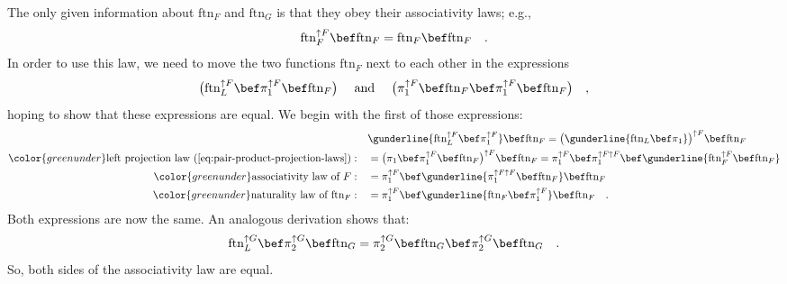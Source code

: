 The only given information about $\text{ftn}_{F}$ and $\text{ftn}_{G}$
is that they obey their associativity laws; e.g.,
\[
\text{ftn}_{F}^{\uparrow F}\bef\text{ftn}_{F}=\text{ftn}_{F}\bef\text{ftn}_{F}\quad.
\]
In order to use this law, we need to move the two functions $\text{ftn}_{F}$
next to each other in the expressions 
\[
\big(\text{ftn}_{L}^{\uparrow F}\bef\pi_{1}^{\uparrow F}\bef\text{ftn}_{F}\big)\quad\text{ and }\quad\big(\pi_{1}^{\uparrow F}\bef\text{ftn}_{F}\bef\pi_{1}^{\uparrow F}\bef\text{ftn}_{F}\big)\quad,
\]
hoping to show that these expressions are equal. We begin with the
first of those expressions:
\begin{align*}
 & \gunderline{\text{ftn}_{L}^{\uparrow F}\bef\pi_{1}^{\uparrow F}}\bef\text{ftn}_{F}=\big(\gunderline{\text{ftn}_{L}\bef\pi_{1}}\big)^{\uparrow F}\bef\text{ftn}_{F}\\
{\color{greenunder}\text{left projection law~(\ref{eq:pair-product-projection-laws})}:}\quad & =\big(\pi_{1}\bef\pi_{1}^{\uparrow F}\bef\text{ftn}_{F}\big)^{\uparrow F}\bef\text{ftn}_{F}=\pi_{1}^{\uparrow F}\bef\pi_{1}^{\uparrow F\uparrow F}\bef\gunderline{\text{ftn}_{F}^{\uparrow F}\bef\text{ftn}_{F}}\\
{\color{greenunder}\text{associativity law of }F:}\quad & =\pi_{1}^{\uparrow F}\bef\gunderline{\pi_{1}^{\uparrow F\uparrow F}\bef\text{ftn}_{F}}\bef\text{ftn}_{F}\\
{\color{greenunder}\text{naturality law of }\text{ftn}_{F}:}\quad & =\pi_{1}^{\uparrow F}\bef\gunderline{\text{ftn}_{F}\bef\pi_{1}^{\uparrow F}}\bef\text{ftn}_{F}\quad.
\end{align*}
Both expressions are now the same. An analogous derivation shows that:
\[
\text{ftn}_{L}^{\uparrow G}\bef\pi_{2}^{\uparrow G}\bef\text{ftn}_{G}=\pi_{2}^{\uparrow G}\bef\text{ftn}_{G}\bef\pi_{2}^{\uparrow G}\bef\text{ftn}_{G}\quad.
\]
So, both sides of the associativity law are equal.


